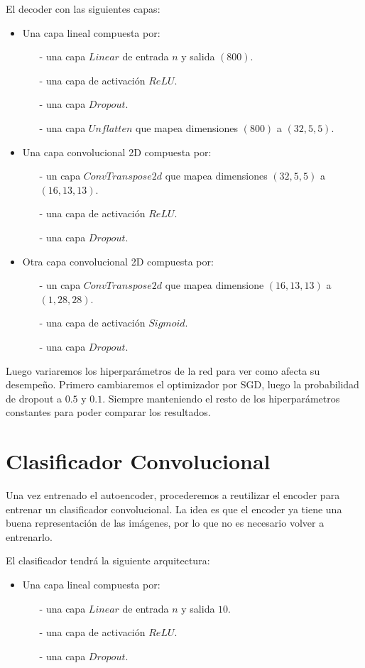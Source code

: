 \documentclass[aps,prl,reprint,groupedaddress]{revtex4-2}
\begin{document}
El decoder con las siguientes capas:
\begin{itemize}
  \item Una capa lineal compuesta por:
  \begin{itemize}
    \item [-] una capa $Linear$ de entrada $n$ y salida $(800)$.
    \item [-] una capa de activación $ReLU$.
    \item [-] una capa $Dropout$.
    \item [-] una capa $Unflatten$ que mapea dimensiones $(800)$ a $(32, 5, 5)$.
  \end{itemize}
  \item Una capa convolucional 2D compuesta por:
  \begin{itemize}
    \item [-] un capa $ConvTranspose2d$ que mapea dimensiones $(32, 5, 5)$ a
    $(16, 13, 13)$.
    \item [-] una capa de activación $ReLU$.
    \item [-] una capa $Dropout$.
  \end{itemize}
  \item Otra capa convolucional 2D compuesta por:
  \begin{itemize}
    \item [-] un capa $ConvTranspose2d$ que mapea dimensione $(16, 13, 13)$ a
    $(1, 28, 28)$.
    \item [-] una capa de activación $Sigmoid$.
    \item [-] una capa $Dropout$.
  \end{itemize}
\end{itemize}

Luego variaremos los hiperparámetros de la red para ver como afecta su 
desempeño. Primero cambiaremos el optimizador por SGD, luego la probabilidad 
de dropout a $0.5$ y $0.1$. Siempre manteniendo el resto de los hiperparámetros
constantes para poder comparar los resultados.

\section{Clasificador Convolucional}
Una vez entrenado el autoencoder, procederemos a reutilizar el encoder para
entrenar un clasificador convolucional. La idea es que el encoder ya tiene
una buena representación de las imágenes, por lo que no es necesario volver a
entrenarlo.

El clasificador tendrá la siguiente arquitectura:
\begin{itemize}
  \item Una capa lineal compuesta por:
  \begin{itemize}
    \item [-] una capa $Linear$ de entrada $n$ y salida $10$.
    \item [-] una capa de activación $ReLU$.
    \item [-] una capa $Dropout$.
  \end{itemize}
\end{itemize}
\end{document}
